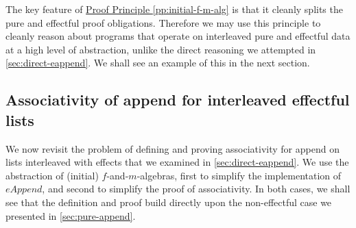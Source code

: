 \documentclass{jfp1}
\newcommand{\proofprinref}[1]{\hyperref[#1]{Proof Principle \ref*{#1}}}
\begin{document}
The key feature of \proofprinref{pp:initial-f-m-alg} is that it
cleanly splits the pure and effectful proof obligations. Therefore we
may use this principle to cleanly reason about programs that operate
on interleaved pure and effectful data at a high level of abstraction,
unlike the direct reasoning we attempted in
\autoref{sec:direct-eappend}. We shall see an example of this in the
next section.

\subsection{Associativity of append for interleaved effectful lists}
\label{sec:f-and-m-append}

We now revisit the problem of defining and proving associativity for
append on lists interleaved with effects that we examined in
\autoref{sec:direct-eappend}. We use the abstraction of (initial)
$f$-and-$m$-algebras, first to simplify the implementation of
$\mathit{eAppend}$, and second to simplify the proof of
associativity. In both cases, we shall see that the definition and
proof build directly upon the non-effectful case we presented in
\autoref{sec:pure-append}.
\end{document}
